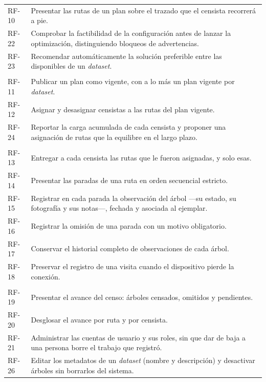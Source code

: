 \begin{xltabular}{\textwidth}{@{}l X@{}}
          \addlinespace
  RF-10 & Presentar las rutas de un plan sobre el trazado que el censista recorrerá a pie. \\
  \addlinespace
  RF-22 & Comprobar la factibilidad de la configuración antes de lanzar la optimización,
          distinguiendo bloqueos de advertencias. \\
          \addlinespace
  RF-23 & Recomendar automáticamente la solución preferible entre las disponibles de un
          \textit{dataset}. \\
          \addlinespace
   \\
  \addlinespace
  RF-11 & Publicar un plan como vigente, con a lo más un plan vigente por \textit{dataset}. \\
  \addlinespace
  RF-12 & Asignar y desasignar censistas a las rutas del plan vigente. \\
  \addlinespace
  RF-24 & Reportar la carga acumulada de cada censista y proponer una asignación de rutas que la
          equilibre en el largo plazo. \\
          \addlinespace
   \\
  \addlinespace
  RF-13 & Entregar a cada censista las rutas que le fueron asignadas, y solo esas. \\
  \addlinespace
  RF-14 & Presentar las paradas de una ruta en orden secuencial estricto. \\
  \addlinespace
  RF-15 & Registrar en cada parada la observación del árbol ---su estado, su fotografía y sus
          notas---, fechada y asociada al ejemplar. \\
          \addlinespace
  RF-16 & Registrar la omisión de una parada con un motivo obligatorio. \\
  \addlinespace
  RF-17 & Conservar el historial completo de observaciones de cada árbol. \\
  \addlinespace
  RF-18 & Preservar el registro de una visita cuando el dispositivo pierde la conexión. \\
  \addlinespace
   \\
  \addlinespace
  RF-19 & Presentar el avance del censo: árboles censados, omitidos y pendientes. \\
  \addlinespace
  RF-20 & Desglosar el avance por ruta y por censista. \\
  \addlinespace
  RF-21 & Administrar las cuentas de usuario y sus roles, sin que dar de baja a una persona borre el
          trabajo que registró. \\
          \addlinespace
  RF-26 & Editar los metadatos de un \textit{dataset} (nombre y descripción) y desactivar árboles
          sin borrarlos del sistema. \\
\end{xltabular}

